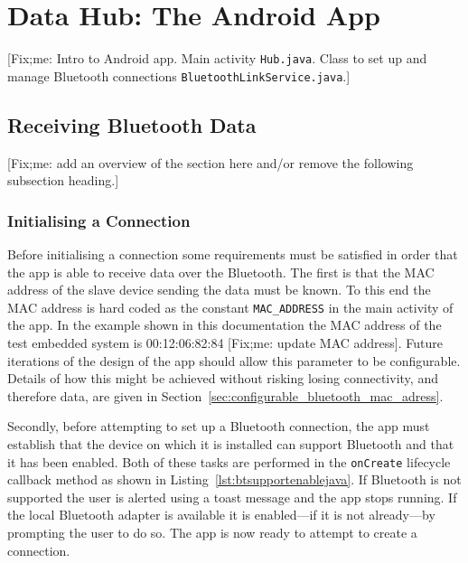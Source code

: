 \documentclass[11pt, a4paper, oneside, english]{scrbook}
\begin{document}
\chapter{Data Hub: The Android App} %
\label{cha:data_hub}
[Fix;me: Intro to Android app. Main activity \texttt{Hub.java}. Class to set up and manage Bluetooth connections \texttt{BluetoothLinkService.java}.]
\section{Receiving Bluetooth Data} %
\label{sec:receiving_bluetooth_data}
[Fix;me: add an overview of the section here and/or remove the following subsection heading.]
\subsection{Initialising a Connection} %
\label{sub:initialising_a_connection}
Before initialising a connection some requirements must be satisfied in order that the app is able to receive data over the Bluetooth. The first is that the MAC address of the slave device sending the data must be known. To this end the MAC address is hard coded as the constant \texttt{MAC\_ADDRESS} in the main activity of the app. In the example shown in this documentation the MAC address of the test embedded system is 00:12:06:82:84 [Fix;me: update MAC address]. Future iterations of the design of the app should allow this parameter to be configurable. Details of how this might be achieved without risking losing connectivity, and therefore data, are given in Section~\ref{sec:configurable_bluetooth_mac_adress}.

Secondly, before attempting to set up a Bluetooth connection, the app must establish that the device on which it is installed can support Bluetooth and that it has been enabled. Both of these tasks are performed in the \texttt{onCreate} lifecycle callback method as shown in Listing~\ref{lst:btsupportenablejava}. If Bluetooth is not supported the user is alerted using a toast message and the app stops running. If the local Bluetooth adapter is available it is enabled---if it is not already---by prompting the user to do so. The app is now ready to attempt to create a connection. 
\end{document}
